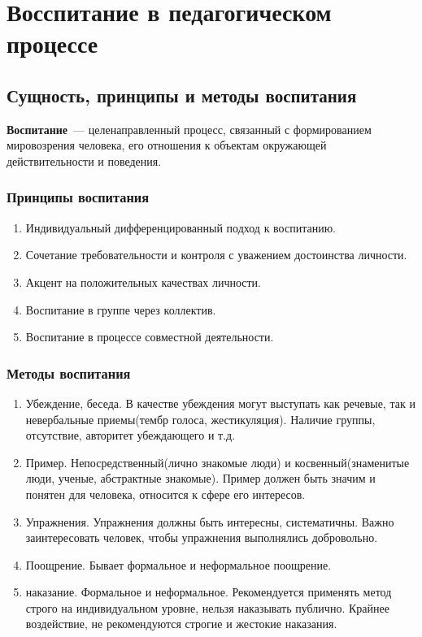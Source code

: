 \section{Восспитание в педагогическом процессе}
\subsection{Сущность, принципы и методы воспитания}
\textbf{Воспитание}~--- целенаправленный процесс, связанный с формированием мировозрения человека, его отношения к объектам окружающей действительности и поведения.

\subsubsection{Принципы воспитания}
\begin{enumerate}
	\item Индивидуальный дифференцированный подход к воспитанию.
	\item Сочетание требовательности и контроля с уважением достоинства личности.
	\item Акцент на положительных качествах личности.
	\item Воспитание в группе через коллектив.
	\item Воспитание в процессе совместной деятельности.
\end{enumerate}

\subsubsection{Методы воспитания}
\begin{enumerate}
	\item Убеждение, беседа. В качестве убеждения могут выступать как речевые, так и невербальные приемы(тембр голоса, жестикуляция). Наличие группы, отсутствие, авторитет убеждающего и т.д.
	\item Пример. Непосредственный(лично знакомые люди) и косвенный(знаменитые люди, ученые, абстрактные знакомые). Пример должен быть значим и понятен для человека, относится к сфере его интересов.
	\item Упражнения. Упражнения должны быть интересны, систематичны. Важно заинтересовать человек, чтобы упражнения выполнялись добровольно.
	\item Поощрение. Бывает формальное и неформальное поощрение.
	\item наказание. Формальное и неформальное. Рекомендуется применять метод строго на индивидуальном уровне, нельзя наказывать публично. Крайнее воздействие, не рекомендуются строгие и жестокие наказания.
\end{enumerate}


